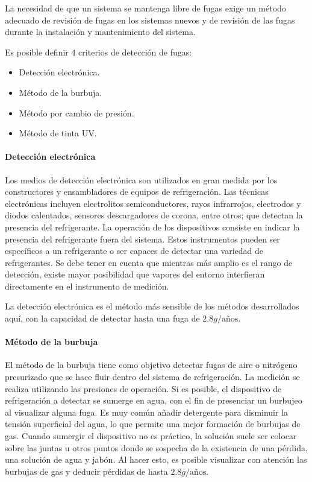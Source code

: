 	La necesidad de que un sistema se mantenga libre de fugas exige un método adecuado de revisión de fugas en los sistemas nuevos y de revisión de las fugas durante la instalación y mantenimiento del sistema.
	
	Es posible definir 4 criterios de detección de fugas:

	\begin{itemize}
		\item Detección electrónica.
		\item Método de la burbuja.
		\item Método por cambio de presión.
		\item Método de tinta UV.
	\end{itemize}

	\paragraph{Detección electrónica}

	Los medios de detección electrónica son utilizados en gran medida por los constructores y ensambladores de equipos de refrigeración. Las técnicas electrónicas incluyen electrolitos semiconductores, rayos infrarrojos, electrodos y diodos calentados, sensores descargadores de corona, entre otros; que detectan la presencia del refrigerante. La operación de los dispositivos consiste en indicar la presencia del refrigerante fuera del sistema. Estos instrumentos pueden ser específicos a un refrigerante o ser capaces de detectar una variedad de refrigerantes. Se debe tener en cuenta que mientras más amplio es el rango de detección, existe mayor posibilidad que vapores del entorno interfieran directamente en el instrumento de medición.

	La detección electrónica es el método más sensible de los métodos desarrollados aquí, con la capacidad de detectar hasta una fuga de $2.8g/\text{años}$.

	\paragraph{Método de la burbuja}

	El método de la burbuja tiene como objetivo detectar fugas de aire o nitrógeno presurizado que se hace fluir dentro del sistema de refrigeración. La medición se realiza utilizando las presiones de operación. Si es posible, el dispositivo de refrigeración a detectar se sumerge en agua, con el fin de presenciar un burbujeo al visualizar alguna fuga. Es muy común añadir detergente para disminuir la tensión superficial del agua, lo que permite una mejor formación de burbujas de gas. Cuando sumergir el dispositivo no es práctico, la solución suele ser colocar sobre las juntas u otros puntos donde se sospecha de la existencia de una pérdida, una solución de agua y jabón. Al hacer esto, es posible visualizar con atención las burbujas de gas y deducir pérdidas de hasta $2.8g/\text{años}$.

